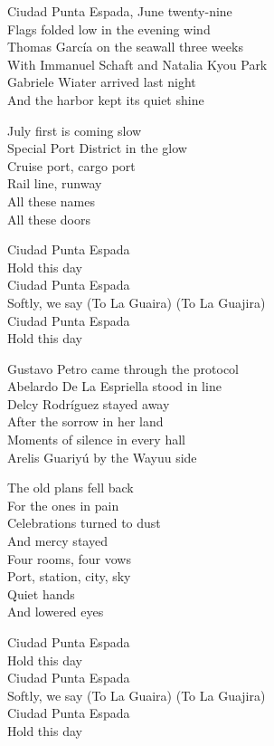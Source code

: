 \begin{lyrics}
Ciudad Punta Espada, June twenty-nine\\
Flags folded low in the evening wind\\
Thomas García on the seawall three weeks\\
With Immanuel Schaft and Natalia Kyou Park\\
Gabriele Wiater arrived last night\\
And the harbor kept its quiet shine

July first is coming slow\\
Special Port District in the glow\\
Cruise port, cargo port\\
Rail line, runway\\
All these names\\
All these doors

Ciudad Punta Espada\\
Hold this day\\
Ciudad Punta Espada\\
Softly, we say
(To La Guaira)
(To La Guajira)\\
Ciudad Punta Espada\\
Hold this day

Gustavo Petro came through the protocol\\
Abelardo De La Espriella stood in line\\
Delcy Rodríguez stayed away\\
After the sorrow in her land\\
Moments of silence in every hall\\
Arelis Guariyú by the Wayuu side

The old plans fell back\\
For the ones in pain\\
Celebrations turned to dust\\
And mercy stayed\\
Four rooms, four vows\\
Port, station, city, sky\\
Quiet hands\\
And lowered eyes

Ciudad Punta Espada\\
Hold this day\\
Ciudad Punta Espada\\
Softly, we say
(To La Guaira)
(To La Guajira)\\
Ciudad Punta Espada\\
Hold this day


\end{lyrics}
